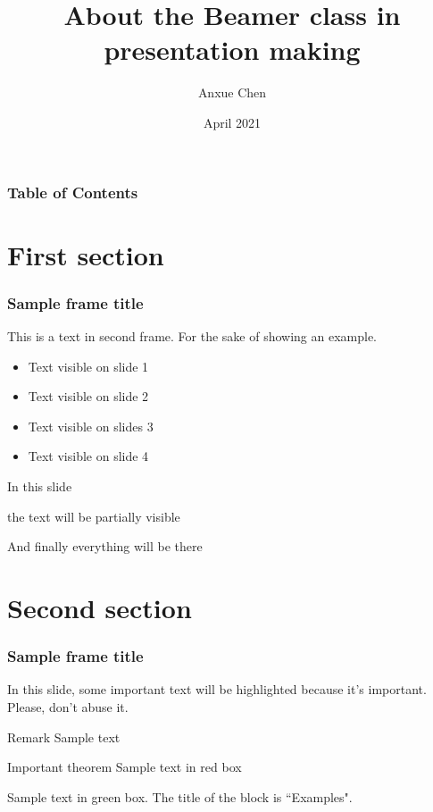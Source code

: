 \documentclass{beamer}
\title[About Beamer] %
{About the Beamer class in presentation making}
\author[Anxue Chen]
{Anxue Chen}
\institute[SJTU]{Shanghai Jiao Tong University}
\date{April 2021}
\begin{document}
\frame{\titlepage}


\begin{frame}
\frametitle{Table of Contents}
\tableofcontents
\end{frame}


\section{First section}

\begin{frame}
\frametitle{Sample frame title}
This is a text in second frame. For the sake of showing an example.

\begin{itemize}
    \item<1-> Text visible on slide 1
    \item<2-> Text visible on slide 2
    \item<3> Text visible on slides 3
    \item<4-> Text visible on slide 4
\end{itemize}
\end{frame}



\begin{frame}
In this slide \pause

the text will be partially visible \pause

And finally everything will be there
\end{frame}

\section{Second section}

\begin{frame}
\frametitle{Sample frame title}

In this slide, some important text will be
\alert{highlighted} because it's important.
Please, don't abuse it.

\begin{block}{Remark}
Sample text
\end{block}

\begin{alertblock}{Important theorem}
Sample text in red box
\end{alertblock}

\begin{examples}
Sample text in green box. The title of the block is ``Examples".
\end{examples}
\end{frame}
\end{document}
